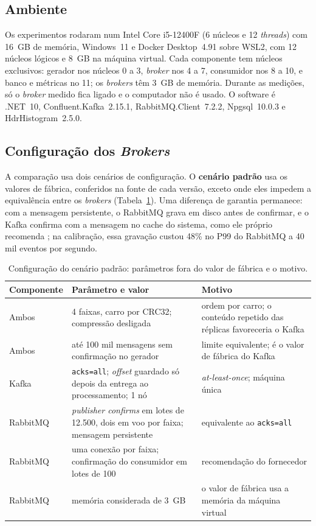 \documentclass[12pt]{article}
\begin{document}
\subsection{Ambiente}

Os experimentos rodaram num Intel Core i5-12400F (6 núcleos e 12 \textit{threads}) com 16~GB de
memória, Windows~11 e Docker Desktop~4.91 sobre WSL2, com 12 núcleos lógicos e 8~GB na
máquina virtual. Cada componente tem núcleos exclusivos: gerador nos núcleos 0 a 3, \textit{broker}
nos 4 a 7, consumidor nos 8 a 10, e banco e métricas no 11; os \textit{brokers} têm 3~GB de memória.
Durante as medições, só o \textit{broker} medido fica ligado e o computador não é usado. O software
é .NET~10, Confluent.Kafka~2.15.1, RabbitMQ.Client~7.2.2, Npgsql~10.0.3 e
HdrHistogram~2.5.0.

\subsection{Configuração dos \textit{Brokers}}
\label{sec:configuracao}

A comparação usa dois cenários de configuração. O \textbf{cenário padrão} usa os valores
de fábrica, conferidos na fonte de cada versão, exceto onde eles impedem a equivalência
entre os \textit{brokers} (Tabela~\ref{tab:configuracao}). Uma diferença de garantia permanece: com
a mensagem persistente, o RabbitMQ grava em disco antes de confirmar, e o Kafka confirma
com a mensagem no cache do sistema, como ele próprio recomenda \cite{kafka:docs}; na
calibração, essa gravação custou 48\% no P99 do RabbitMQ a 40 mil eventos por segundo.

\begin{table}[ht]
\centering
\caption{Configuração do cenário padrão: parâmetros fora do valor de fábrica e o motivo.}
\label{tab:configuracao}
\small
\begin{tabular}{|p{2.2cm}|p{6.4cm}|p{5.3cm}|}
\hline
\textbf{Componente} & \textbf{Parâmetro e valor} & \textbf{Motivo} \\
\hline
Ambos & 4 faixas, carro por CRC32; compressão desligada & ordem por carro; o conteúdo repetido das réplicas favoreceria o Kafka \\
\hline
Ambos & até 100 mil mensagens sem confirmação no gerador & limite equivalente; é o valor de fábrica do Kafka \\
\hline
Kafka & \texttt{acks=all}; \textit{offset} guardado só depois da entrega ao processamento; 1 nó & \textit{at-least-once}; máquina única \\
\hline
RabbitMQ & \textit{publisher confirms} em lotes de 12.500, dois em voo por faixa; mensagem persistente & equivalente ao \texttt{acks=all} \\
\hline
RabbitMQ & uma conexão por faixa; confirmação do consumidor em lotes de 100 & recomendação do fornecedor \\
\hline
RabbitMQ & memória considerada de 3~GB & o valor de fábrica usa a memória da máquina virtual \\
\hline
\end{tabular}
\end{table}
\end{document}
